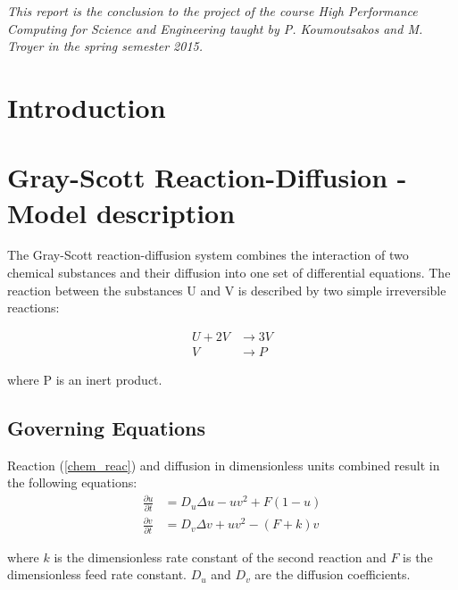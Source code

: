 \documentclass[11pt,a4paper]{article} %
\begin{document}
\begin{minipage}{1.\textwidth}

\end{minipage}

\textit{This report is the conclusion to the project of the course High Performance Computing for Science and Engineering taught by P. Koumoutsakos and M. Troyer in the spring semester 2015.}

\section{Introduction}


\section{Gray-Scott Reaction-Diffusion - Model description} 

The Gray-Scott reaction-diffusion system \cite{gray1983autocatalytic} combines the interaction of two chemical substances and their diffusion into one set of differential equations.
The reaction between the substances U and V is described by two simple irreversible reactions:

\begin{equation} \label{chem_reac}
\begin{aligned}
	U + 2V &\rightarrow 3V \\
	V &\rightarrow P
\end{aligned}
\end{equation} 

where P is an inert product. 

\subsection{Governing Equations}

Reaction (\ref{chem_reac}) and diffusion in dimensionless units combined result in the following equations:
\begin{equation} \label{reac_diff}
\begin{aligned}
\frac{\partial u}{\partial t} &= D_u \Delta u - uv^2 + F(1-u) \\
\frac{\partial v}{\partial t} &= D_v \Delta v + uv^2 - (F+k)v
\end{aligned}
\end{equation}

where $k$ is the dimensionless rate constant of the second reaction and $F$ is the dimensionless feed rate constant. 
$D_u$ and $D_v$ are the diffusion coefficients.
\end{document}

